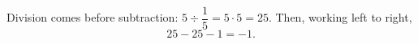 Division comes before subtraction: $5\div\dfrac{1}{5}=5\cdot5=25$. Then, working left to right,
\[
25-25-1=\boxed{-1}.
\]

